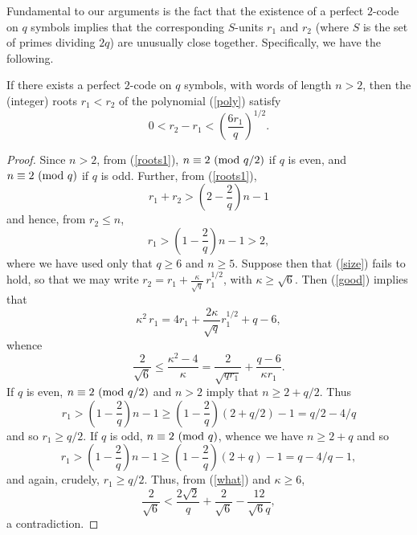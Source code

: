 \documentclass{amsart}
\def\mod#1{{\ifmmode\text{\rm\ (mod~$#1$)}
\else\discretionary{}{}{\hbox{ }}\rm(mod~$#1$)\fi}}
\begin{document}
Fundamental to our arguments is the fact that the existence of a perfect $2$-code on $q$ symbols implies that the corresponding $S$-units $r_1$ and $r_2$ (where $S$ is the set of primes dividing $2q$) are unusually close together. Specifically, we have the following.
\begin{prop} \label{Goop}
If there exists a perfect $2$-code on $q$ symbols, with words of length $n>2$, then the (integer) roots $r_1<r_2$ of the polynomial (\ref{poly}) satisfy
\begin{equation} \label{size}
0 < r_2-r_1 < \left( \frac{6r_1}{q} \right)^{1/2}.
\end{equation}
\end{prop}

\begin{proof}
Since $n > 2$,  from (\ref{roots1}),  $n \equiv 2 \mod{q/2}$ if $q$ is even, and  $n \equiv 2 \mod{q}$ if $q$ is odd. Further, from (\ref{roots1}),
$$
r_1+r_2 > \left( 2 -\frac{2}{q} \right) n  -1 
$$
and hence, from $r_2 \leq n$, 
\begin{equation} \label{r1low}
r_1 > \left( 1 -\frac{2}{q} \right) n  -1 > 2,
\end{equation}
where we have used only that $q \geq 6$ and $n \geq 5$. Suppose then that (\ref{size}) fails to hold, so that we may write $r_2=r_1+\frac{\kappa}{\sqrt{q}} \,  r_1^{1/2}$, with $\kappa \geq \sqrt{6}$. Then (\ref{good}) implies that
$$
\kappa^2  \, r_1 = 4 r_1+ \frac{2 \kappa}{\sqrt{q}} r_1^{1/2} +q-6,
$$
whence
\begin{equation} \label{what}
\frac{2}{\sqrt{6}} \leq \frac{\kappa^2-4}{\kappa} = \frac{2}{\sqrt{q r_1}} + \frac{q-6}{\kappa r_1}.
\end{equation}
If $q$ is even, $n \equiv 2 \mod{q/2}$ and $n > 2$ imply that  $n \geq 2+q/2$. Thus
$$
r_1 > \left( 1 -\frac{2}{q} \right) n  -1 \geq 
\left( 1 -\frac{2}{q} \right) (2+q/2)-1 =q/2-4/q
$$
and so $r_1 \geq q/2$. If $q$ is odd, $n \equiv 2 \mod{q}$, whence
we have $n \geq 2+q$ and so 
$$
r_1 > \left( 1 -\frac{2}{q} \right) n  -1 \geq 
\left( 1 -\frac{2}{q} \right) (2+q)-1 =q-4/q-1,
$$
and again, crudely, $r_1 \geq q/2$. Thus, from (\ref{what}) and $\kappa \geq 6$, 
$$
\frac{2}{\sqrt{6}}  
< \frac{2\sqrt{2}}{q} + \frac{2}{\sqrt{6}}  -\frac{12}{\sqrt{6} q},
$$
a contradiction.
\end{proof}
\end{document}
